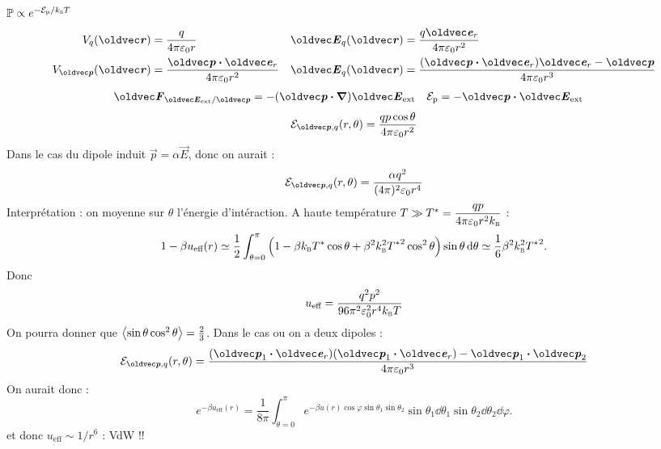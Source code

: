 \begin{solution}
    \begin{questions}
        \question $\mathbb{P} \propto e^{-\cal{E}_\text{p}/k_\textsc{b}T}$
        \question \begin{align*}
            V_q(\vr) &= \dfrac{q}{4\pi\ep_0r} & \vec{E}_q(\vr) &= \dfrac{q\vec{e}_r}{4\pi\ep_0r^2} \\
            V_{\vec{p}}(\vr) &= \dfrac{\vec{p}\vdot\vec{e}_r}{4\pi\ep_0r^2} & \vec{E}_q(\vr) &= \dfrac{\qty(\vec{p}\vdot\vec{e}_r)\vec{e}_r - \vec{p}}{4\pi\ep_0r^3}
        \end{align*}
        \question \begin{align*}
           \vec{F}_{\vec{E}_\text{ext}/\vec{p}} &= -(\vec{p}\vdot\grad)\vec{E}_\text{ext} &
           \cal{E}_\text{p} &= -\vec{p}\vdot\vec{E}_\text{ext}
        \end{align*}
        \question $$\cal{E}_{\vec{p},q}(r,\theta) = \dfrac{q p \cos\theta}{4\pi\ep_0 r^2}$$
        \question Dans le cas du dipole induit $\vec{p} = \alpha \vec{E}$, donc on aurait :
        $$\cal{E}_{\vec{p},q}(r,\theta) = \dfrac{\alpha q^2}{(4\pi)^2\ep_0 r^4}$$
        \question Interprétation : on moyenne sur $\theta$ l'énergie d'intéraction.
        \question A haute température $T \gg T^\ast = \dfrac{q p}{4\pi\ep_0 r^2 k_\textsc{b}}$ :
        $$1-\beta u_\text{eff}(r) \simeq \dfrac{1}{2}\int_{\theta=0}^\pi \qty(1 - \beta k_\textsc{b} T^\ast \cos\theta + \beta^2 k_\textsc{b}^2 {T^\ast}^2 \cos^2\theta ) \sin\theta\dd{\theta} \simeq \dfrac{1}{6}\beta^2 k_\textsc{b}^2 {T^\ast}^2.$$
        Donc $$u_\text{eff} = \dfrac{q^2 p^2}{96\pi^2\ep_0^2 r^4 k_\textsc{b} T}$$
        On pourra donner que $\ev{\sin\theta\cos^2\theta} = \frac{2}{3}$.
        \question Dans le cas ou on a deux dipoles :
        $$\cal{E}_{\vec{p},q}(r,\theta) = \dfrac{(\vec{p}_1\vdot\vec{e}_r)(\vec{p}_1\vdot\vec{e}_r) - \vec{p}_1\vdot\vec{p}_2}{4\pi\ep_0 r^3}$$
        On aurait donc :
        $$e^{-\beta u_\text{eff}(r)} = \dfrac{1}{8\pi}\int_{\theta=0}^\pi e^{-\beta u(r)\cos\varphi\sin\theta_1\sin\theta_2} \sin\theta_1\dd{\theta_1}\sin\theta_2\dd{\theta_2}\dd{\varphi}.$$
        et donc $u_\text{eff} \sim 1/r^6$ : VdW !!
    \end{questions}
\end{solution}